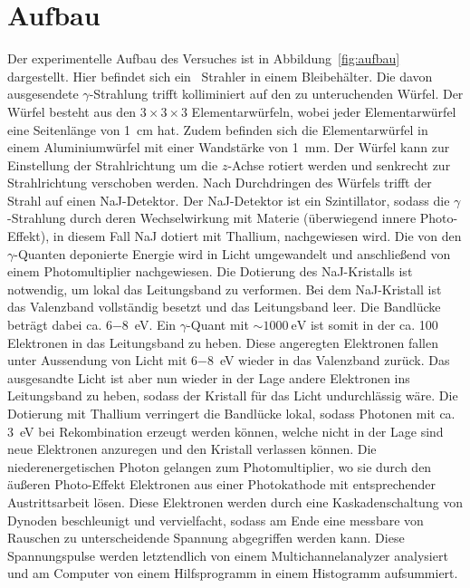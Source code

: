 

\section{Aufbau}

Der experimentelle Aufbau des Versuches ist in Abbildung~\ref{fig:aufbau}
dargestellt. Hier befindet sich ein \Cs~Strahler in einem Bleibehälter.
Die davon ausgesendete $\gamma$-Strahlung trifft kolliminiert auf den zu
unteruchenden Würfel. Der Würfel besteht aus den $3\times 3 \times 3$
Elementarwürfeln, wobei jeder Elementarwürfel eine Seitenlänge von \SI{1}{\cm}
hat. Zudem befinden sich die Elementarwürfel in einem Aluminiumwürfel mit einer
Wandstärke von \SI{1}{\mm}. Der Würfel kann zur Einstellung der Strahlrichtung
um die $z$-Achse rotiert werden und senkrecht zur Strahlrichtung verschoben
werden. Nach Durchdringen des Würfels trifft der Strahl auf einen NaJ-Detektor.
Der NaJ-Detektor ist ein Szintillator, sodass die $\gamma$-Strahlung durch
deren Wechselwirkung mit Materie (überwiegend innere Photo-Effekt),
in diesem Fall NaJ dotiert mit Thallium,
nachgewiesen wird.\cite{kern_und_teilchenphysik}
Die von den $\gamma$-Quanten deponierte Energie wird in
Licht umgewandelt und anschließend von einem Photomultiplier nachgewiesen.
Die Dotierung des NaJ-Kristalls ist notwendig, um lokal das Leitungsband zu
verformen. Bei dem NaJ-Kristall ist das Valenzband vollständig besetzt und das
Leitungsband leer. Die Bandlücke beträgt dabei ca. \SI{6-8}{\eV}.
Ein $\gamma$-Quant mit $\sim \SI{1000}{\eV}$ ist somit in der ca. 100
Elektronen in das Leitungsband zu heben. Diese angeregten Elektronen fallen
unter Aussendung von Licht mit \SI{6-8}{\eV} wieder in das Valenzband zurück.
Das ausgesandte Licht ist aber nun wieder in der Lage andere Elektronen ins
Leitungsband zu heben, sodass der Kristall für das Licht undurchlässig wäre.
Die Dotierung mit Thallium verringert die Bandlücke lokal, sodass Photonen mit
ca. \SI{3}{\eV} bei Rekombination erzeugt werden können, welche nicht in der
Lage sind neue Elektronen anzuregen und den Kristall verlassen können.
Die niederenergetischen Photon gelangen zum Photomultiplier, wo sie durch den
äußeren Photo-Effekt Elektronen aus einer Photokathode mit entsprechender
Austrittsarbeit lösen. Diese Elektronen werden durch eine Kaskadenschaltung von
Dynoden beschleunigt und vervielfacht, sodass am Ende eine messbare von
Rauschen zu unterscheidende Spannung abgegriffen werden kann.
Diese Spannungspulse werden letztendlich von einem Multichannelanalyzer
analysiert und am Computer von einem Hilfsprogramm in einem Histogramm
aufsummiert.


